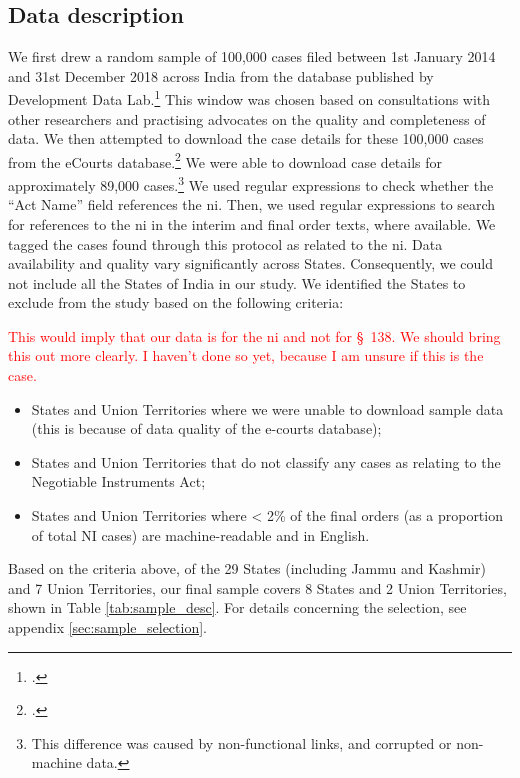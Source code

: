\subsection{Data description} \label{sec:data-description}

We first drew a random sample of 100,000 cases filed between 1st January 2014 and 31st December 2018 across India from the database published by Development Data Lab.\footcite{devdatalabs2021_eCourtsData} This window was chosen based on consultations with other researchers and practising advocates on the quality and completeness of data. We then attempted to download the case details for these 100,000 cases from the eCourts database.\footcite{ecourts2022} We were able to download case details for approximately 89,000 cases.\footnote{This difference was caused by non-functional links, and corrupted or non-machine data.} We used regular expressions to check whether the ``Act Name'' field references the \gls{ni}. Then, we used regular expressions to search for references to the \gls{ni} in the interim and final order texts, where available. We tagged the cases found through this protocol as related to the \gls{ni}. Data availability and quality vary significantly across States. Consequently, we could not include all the States of India in our study. We identified the States to exclude from the study based on the following criteria:

\textcolor{red}{This would imply that our data is for the \gls{ni} and not for \S~138. We should bring this out more clearly. I haven't done so yet, because I am unsure if this is the case.}

\begin{itemize}
\item States and Union Territories where we were unable to download sample data (this is because of data quality of the e-courts database);
\item States and Union Territories that do not classify any cases as relating to the Negotiable Instruments Act;
\item States and Union Territories where < 2\% of the final orders (as a proportion of total NI cases) are machine-readable and in English.
\end{itemize}

Based on the criteria above, of the 29 States (including Jammu and Kashmir) and 7 Union Territories, our final sample covers 8 States and 2 Union Territories, shown in Table \ref{tab:sample_desc}. For details concerning the selection, see appendix \ref{sec:sample_selection}.

